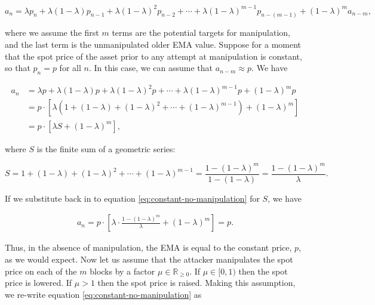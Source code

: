 \documentclass[bibliography=numbered]{article}
\begin{document}
\begin{equation}
a_{n}
=
\lambda p_{n} + \lambda (1 - \lambda) p_{n - 1} + \lambda (1 - \lambda)^2 p_{n - 2} + \cdots + \lambda (1 - \lambda)^{m - 1}  p_{n - (m - 1)} + (1 - \lambda)^m a_{n - m},
\end{equation}

where we assume the first $m$ terms are the potential targets for manipulation, and the last term is the unmanipulated older EMA value. Suppose for a moment that the spot price of the asset prior to any attempt at manipulation is constant, so that $p_{n} = p$ for all $n$. In this case, we can assume that $a_{n - m} \approx p$. We have

\begin{align}
\label{eq:constant-no-manipulation}
a_{n}
&=
\lambda p + \lambda (1 - \lambda) p + \lambda (1 - \lambda)^2 p + \cdots + \lambda (1 - \lambda)^{m - 1}  p + (1 - \lambda)^m p \\ \nonumber
&=
p \cdot \left[ \lambda \left(1 + (1 - \lambda) + (1 - \lambda)^2 + \cdots + (1 - \lambda)^{m - 1} \right) + (1 - \lambda)^m \right] \\ \nonumber
&=
p \cdot \left[ \lambda S + (1 - \lambda)^m \right],
\end{align}

where $S$ is the finite sum of a geometric series:

\begin{equation}
    \label{eq:sum-finite-geometric-series}
    S = 1 + (1 - \lambda) + (1 - \lambda)^2 + \cdots + (1 - \lambda)^{m - 1} = \frac{1 - (1 - \lambda)^m}{1 - (1 - \lambda)} = \frac{1 - (1 - \lambda)^m}{\lambda}.
\end{equation}

If we substitute back in to equation \eqref{eq:constant-no-manipulation} for $S$, we have

\begin{align}
a_{n}
=
p \cdot \left[ \lambda \cdot \frac{1 - (1 - \lambda)^m}{\lambda} + (1 - \lambda)^m \right] = p.
\end{align}

Thus, in the absence of manipulation, the EMA is equal to the constant price, $p$, as we would expect. Now let us assume that the attacker manipulates the spot price on each of the $m$ blocks by a factor $\mu \in \mathbb{R}_{\geq 0}$. If $\mu \in [0, 1)$ then the spot price is lowered. If $\mu > 1$ then the spot price is raised. Making this assumption, we re-write equation \eqref{eq:constant-no-manipulation} as
\end{document}
